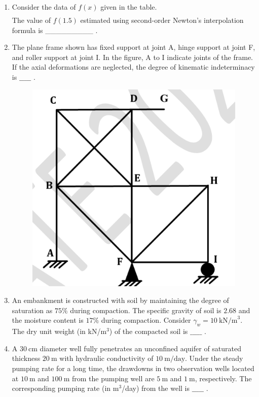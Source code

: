 \documentclass[journal]{IEEEtran}
\begin{document}
\begin{enumerate}
\item Consider the data of $f(x)$ given in the table.  
\begin{align}
 
\end{align}
The value of $f(1.5)$ estimated using second-order Newton's interpolation formula 
is \_\_\_\_\_\_\_\_\_ .  
\hfill {}
  

\item The plane frame shown has fixed support at joint A, hinge support at joint F, and roller support at joint I. In the figure, A to I indicate joints of the frame.  
If the axial deformations are neglected, the degree of kinematic indeterminacy is $\_\_\_\_\_$ .  

\begin{figure}[H]
    \centering
    \includegraphics[width=0.3\columnwidth]{figs/Q33.png} 
    \caption{}
    \label{fig:placeholder}
\end{figure}
\hfill {}  

\item An embankment is constructed with soil by maintaining the degree of saturation as $75\%$ during compaction. The specific gravity of soil is $2.68$ and the moisture content is $17\%$ during compaction. Consider $\gamma_w = 10 \ \text{kN/m}^3$.  
The dry unit weight (in kN/m$^3$) of the compacted soil is $\_\_\_\_\_$ .  
\hfill {}  

\item A $30 \ \text{cm}$ diameter well fully penetrates an unconfined aquifer of saturated thickness $20 \ \text{m}$ with hydraulic conductivity of $10 \ \text{m/day}$. Under the steady pumping rate for a long time, the drawdowns in two observation wells located at $10 \ \text{m}$ and $100 \ \text{m}$ from the pumping well are $5 \ \text{m}$ and $1 \ \text{m}$, respectively.  
The corresponding pumping rate (in m$^3$/day) from the well is $\_\_\_\_\_$ .  
\hfill {}  


\end{enumerate}
\end{document}
